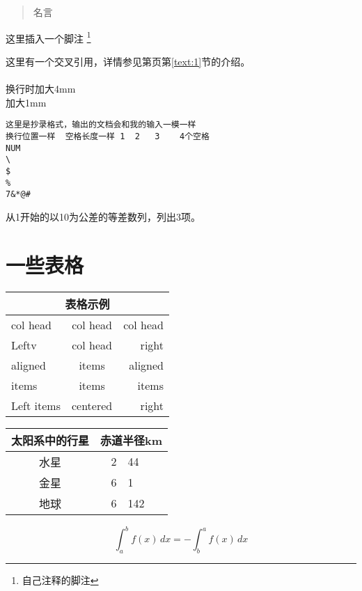 \documentclass{article}
\begin{document}
\begin{quote}
    名言
\end{quote}

这里插入一个脚注
\footnote{自己注释的脚注}

这里有一个交叉引用\label{text:1}，详情参见第\pageref{text:1}页第\ref{text:1}节的介绍。\\

{\\[4mm]
换行时加大4mm\\[1mm]
加大1mm\\}

\begin{verbatim}
这里是抄录格式，输出的文档会和我的输入一模一样
换行位置一样  空格长度一样 1  2   3    4个空格
NUM
\
$
%
7&*@#

\end{verbatim}

从1开始的以10为公差的等差数列，列出3项。
\newpage
\section{一些表格}

\begin{tabular}{|l|c|r|}
\hline
\multicolumn{3}{|c|}{表格示例}\\
\hline
col head &col head & col head\\
\hline
Leftv & col head & right\\
\cline{1-2}
aligned & items & aligned\\
\cline{2-3}
items&items&items\\\cline{1-2}

Left items& centered & right\\
\hline

\end{tabular}



\par
\begin{tabular}{c r @{.} l}
  \hline
  太阳系中的行星&\multicolumn{2}{c}{赤道半径km}\\
  \hline
  水星&2&44\\
  金星&6&1\\
  地球&6\:378&142\\
  \hline
\end{tabular}




\par
\begin{equation}
  \boxed{\int^{b}_{a}f(x)\,dx=-\int_{b}^{a}f(x)\,dx}
\end{equation}
\end{document}
